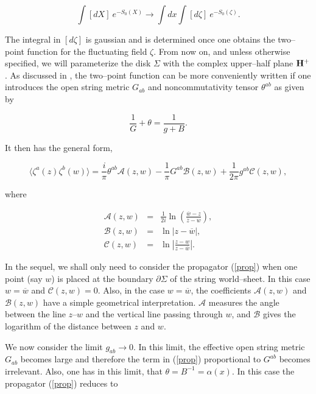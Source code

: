 \documentclass[a4paper,11pt]{article}
\newcommand{\mathbb}[1]{{\bf{#1}}}
\begin{document}
$$
\int [dX]\ e^{-S_{0}\left( X\right) }\rightarrow \int dx \int 
[d\zeta]\ e^{-S_{0}\left( \zeta \right) }.
$$

The integral in $[d\zeta]$ is gaussian and is determined once one obtains 
the two--point function for the fluctuating field $\zeta$. From now on, 
and unless otherwise specified, we will parameterize the disk $\Sigma$ with 
the complex upper--half plane $\mathbb{H}^{+}$. As discussed in \cite{ACNY, 
Schomerus, Seiberg-Witten}, the two--point function can be more 
conveniently written if one introduces the open string metric $G_{ab}$ and 
noncommutativity tensor $\theta^{ab}$ as given by

$$
\frac{1}{G}+\theta =\frac{1}{g+B}.
$$

\noindent
It then has the general form,

\begin{equation}
\langle \zeta^{a} \left( z\right) \zeta^{b} \left( w\right) \rangle = 
\frac{i}{\pi} \theta^{ab} \mathcal{A}\left( z,w\right) - 
\frac{1}{\pi} G^{ab} \mathcal{B}\left( z,w\right) + 
\frac{1}{2\pi} g^{ab} \mathcal{C}\left( z,w\right) ,
\label{prop}
\end{equation}

\noindent
where 

\begin{eqnarray*}
\mathcal{A}\left( z,w\right) &=& \frac{1}{2i} \ln \left( 
\frac{\overline{w}-z} {\overline{z}-w} \right) , \\
\mathcal{B}\left( z,w\right) &=& \ln \left| z-\overline{w} \right| , \\
\mathcal{C}\left( z,w\right) &=& \ln \left| \frac{z-w}{z-\overline{w}} 
\right| .
\end{eqnarray*}

\noindent
In the sequel, we shall only need to consider the propagator (\ref{prop})
when one point (say $w$) is placed at the boundary $\partial \Sigma$ of the
string world--sheet. In this case $w=\overline{w}$ and $\mathcal{C}\left(
z,w\right) = 0$. Also, in the case $w=\overline{w}$, the coefficients 
$\mathcal{A}\left( z,w\right)$ and $\mathcal{B}\left( z,w\right)$ have a
simple geometrical interpretation. $\mathcal{A}$ measures the angle 
between the line $z$--$w$ and the vertical line passing through $w$, and 
$\mathcal{B}$ gives the logarithm of the distance between $z$ and $w$.

We now consider the limit $g_{ab}\rightarrow 0$. In this limit, the
effective open string metric $G_{ab}$ becomes large and therefore the term
in (\ref{prop}) proportional to $G^{ab}$ becomes irrelevant. Also, one 
has in this limit, that $\theta = B^{-1} = \alpha(x)$. In this case the 
propagator (\ref{prop}) reduces to
\end{document}
